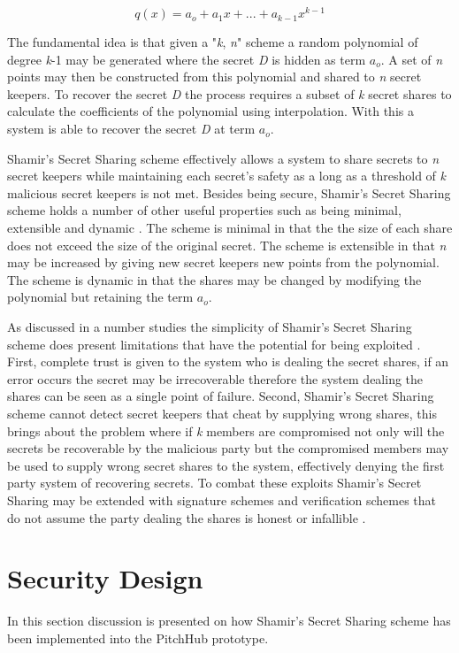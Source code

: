 \[q(x) = a_o +a_1x + ... + a_{k-1}x^{k-1} \]

The fundamental idea is that given a "\textit{k}, \textit{n}" scheme a random polynomial of degree \textit{k}-1 may be generated where the secret \textit{D} is hidden as term \(a_o\). A set of \textit{n} points may then be constructed from this polynomial and shared to \textit{n} secret keepers. To recover the secret \textit{D} the process requires a subset of \textit{k} secret shares to calculate the coefficients of the polynomial using interpolation. With this a system is able to recover the secret \textit{D} at term \(a_o\).
\par
Shamir's Secret Sharing scheme effectively allows a system to share secrets to \textit{n} secret keepers while maintaining each secret's safety as a long as a threshold of \textit{k} malicious secret keepers is not met. Besides being secure, Shamir's Secret Sharing scheme holds a number of other useful properties such as being minimal, extensible and dynamic \cite{shamir1979share}. The scheme is minimal in that the the size of each share does not exceed the size of the original secret. The scheme is extensible in that \textit{n} may be increased by giving new secret keepers new points from the polynomial. The scheme is dynamic in that the shares may be changed by modifying the polynomial but retaining the term \(a_o\).
\par
As discussed in a number studies the simplicity of Shamir's Secret Sharing scheme does present limitations that have the potential for being exploited \cite{abdallah2015analysis}\cite{dautrich2012security}. First, complete trust is given to the system who is dealing the secret shares, if an error occurs the secret may be irrecoverable therefore the system dealing the shares can be seen as a single point of failure. Second, Shamir's Secret Sharing scheme cannot detect secret keepers that cheat by supplying wrong shares, this brings about the problem where if \textit{k} members are compromised not only will the secrets be recoverable by the malicious party but the compromised members may be used to supply wrong secret shares to the system, effectively denying the first party system of recovering secrets. To combat these exploits Shamir's Secret Sharing may be extended with signature schemes \cite{shoup2000practical}\cite{abdalla2001forward} and verification schemes that do not assume the party dealing the shares is honest or infallible \cite{herzberg1995proactive}\cite{cachin2002asynchronous}.

\section{Security Design}
In this section discussion is presented on how Shamir's Secret Sharing scheme has been implemented into the PitchHub prototype.


